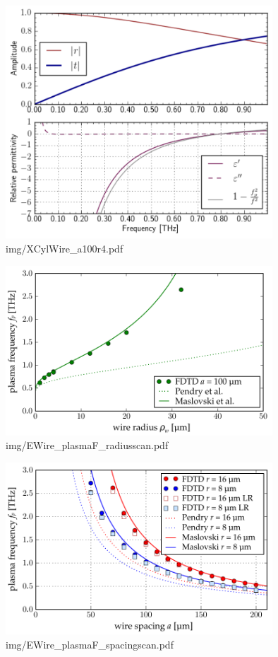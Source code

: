 \begin{figure} \caption{img/XCylWire\_a100r4.pdf}  \centering \includegraphics[width=10cm]{img/XCylWire_a100r4.pdf} \end{figure} \clearpage
\begin{figure} \caption{img/EWire\_plasmaF\_radiusscan.pdf}  \centering \includegraphics[width=10cm]{img/EWire_plasmaF_radiusscan.pdf} \end{figure} \clearpage
\begin{figure} \caption{img/EWire\_plasmaF\_spacingscan.pdf}  \centering \includegraphics[width=10cm]{img/EWire_plasmaF_spacingscan.pdf} \end{figure} \clearpage
